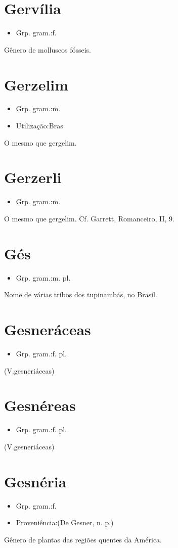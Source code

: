 \section{Gervília}
\begin{itemize}
\item {Grp. gram.:f.}
\end{itemize}
Gênero de molluscos fósseis.
\section{Gerzelim}
\begin{itemize}
\item {Grp. gram.:m.}
\end{itemize}
\begin{itemize}
\item {Utilização:Bras}
\end{itemize}
O mesmo que \textunderscore gergelim\textunderscore .
\section{Gerzerli}
\begin{itemize}
\item {Grp. gram.:m.}
\end{itemize}
O mesmo que \textunderscore gergelim\textunderscore . Cf. Garrett, \textunderscore Romanceiro\textunderscore , II, 9.
\section{Gés}
\begin{itemize}
\item {Grp. gram.:m. pl.}
\end{itemize}
Nome de várias tríbos dos tupinambás, no Brasil.
\section{Gesneráceas}
\begin{itemize}
\item {Grp. gram.:f. pl.}
\end{itemize}
(V.gesneriáceas)
\section{Gesnéreas}
\begin{itemize}
\item {Grp. gram.:f. pl.}
\end{itemize}
(V.gesneriáceas)
\section{Gesnéria}
\begin{itemize}
\item {Grp. gram.:f.}
\end{itemize}
\begin{itemize}
\item {Proveniência:(De \textunderscore Gesner\textunderscore , n. p.)}
\end{itemize}
Gênero de plantas das regiões quentes da América.
